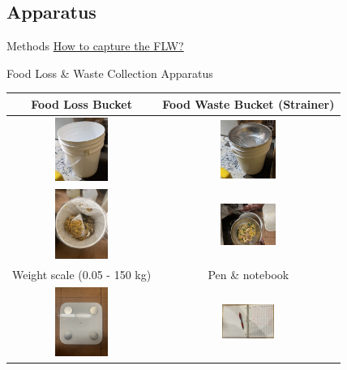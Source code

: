 \documentclass{beamer}
\begin{document}
\subsection{Apparatus}
\begin{frame}{Methods}
    \underline{How to capture the FLW?}
    \begin{block}{Food Loss \& Waste Collection Apparatus}
            \begin{tabular}{cc}
                    \small Food Loss Bucket & \small Food Waste Bucket (Strainer) \\ \hline
                    \includegraphics[width=1.7cm]{busket.jpg}
                    & 
                    \includegraphics[width=1.8cm]{busketStrainer.jpg}\\
                    \includegraphics[width=1.7cm]{fl.jpg}
                    & 
                    \includegraphics[width=1.8cm]{leftovers.jpg}\\
                    \hline
                    \small Weight scale (0.05 - 150 kg) & \small Pen \& notebook\\ %
                    \includegraphics[width=1.7cm]{scale.jpg}
                    & 
                    \includegraphics[width=1.7cm]{notebookPen.jpg}
            \end{tabular}
    \end{block}
\end{frame}
\end{document}
